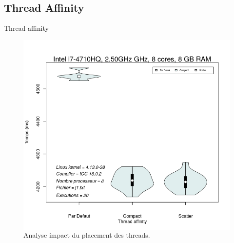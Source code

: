 \documentclass{beamer}
\begin{document}
\subsection{Thread Affinity}
\begin{frame}{Thread affinity}
	\begin{figure}
	\begin{columns}
      \caption{Analyse impact du placement des threads.\label{Fig:thread_affinity}}
      \includegraphics[width=\textwidth]{defaultVSscatterVScompact.png}
    \end{columns}	
   		
	\end{figure}
\end{frame}
\end{document}

